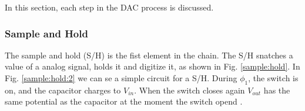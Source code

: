 \documentclass[english, 12pt, a4paper]{article}
\begin{document}

In this section, each step in the DAC process is discussed. 
\subsubsection{Sample and Hold}
The sample and hold (S/H) is the fist element in the chain. The S/H snatches a value of a analog signal, holds it and digitize it, as shown in Fig. \ref{sample:hold}. In Fig. \ref{sample:hold:2}
we can se a simple circuit for a S/H. During \(\phi_{1}\), the switch is on, and the capacitor charges to \(V_{in}\). When the switch closes again $V_{out}$ has the same potential as the capacitor 
at the moment the switch opend \cite{basic-sample-hold}. 
\end{document}
